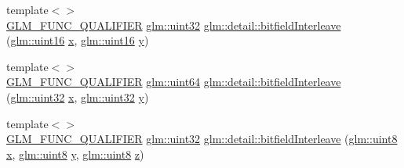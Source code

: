 \begin{DoxyCompactItemize}
\item 
{\footnotesize template$<$$>$ }\\\mbox{\hyperlink{setup_8hpp_a33fdea6f91c5f834105f7415e2a64407}{G\+L\+M\+\_\+\+F\+U\+N\+C\+\_\+\+Q\+U\+A\+L\+I\+F\+I\+ER}} \mbox{\hyperlink{group__gtc__type__precision_ga202b6a53c105fcb7e531f9b443518451}{glm\+::uint32}} \mbox{\hyperlink{namespaceglm_1_1detail_ac5f2b38221d4447775e88f1b003f8113}{glm\+::detail\+::bitfield\+Interleave}} (\mbox{\hyperlink{group__gtc__type__precision_gad8c2939e1fdd8e5828b31d95c52255d5}{glm\+::uint16}} \mbox{\hyperlink{glad_8h_a92d0386e5c19fb81ea88c9f99644ab1d}{x}}, \mbox{\hyperlink{group__gtc__type__precision_gad8c2939e1fdd8e5828b31d95c52255d5}{glm\+::uint16}} \mbox{\hyperlink{glad_8h_a66ddd433d2cacfe27f5906b7e86faeed}{y}})
\item 
{\footnotesize template$<$$>$ }\\\mbox{\hyperlink{setup_8hpp_a33fdea6f91c5f834105f7415e2a64407}{G\+L\+M\+\_\+\+F\+U\+N\+C\+\_\+\+Q\+U\+A\+L\+I\+F\+I\+ER}} \mbox{\hyperlink{group__gtc__type__precision_gae3632bf9b37da66233d78930dd06378a}{glm\+::uint64}} \mbox{\hyperlink{namespaceglm_1_1detail_a7f40bc91b3d293fae0f7df8de85cdcc6}{glm\+::detail\+::bitfield\+Interleave}} (\mbox{\hyperlink{group__gtc__type__precision_ga202b6a53c105fcb7e531f9b443518451}{glm\+::uint32}} \mbox{\hyperlink{glad_8h_a92d0386e5c19fb81ea88c9f99644ab1d}{x}}, \mbox{\hyperlink{group__gtc__type__precision_ga202b6a53c105fcb7e531f9b443518451}{glm\+::uint32}} \mbox{\hyperlink{glad_8h_a66ddd433d2cacfe27f5906b7e86faeed}{y}})
\item 
{\footnotesize template$<$$>$ }\\\mbox{\hyperlink{setup_8hpp_a33fdea6f91c5f834105f7415e2a64407}{G\+L\+M\+\_\+\+F\+U\+N\+C\+\_\+\+Q\+U\+A\+L\+I\+F\+I\+ER}} \mbox{\hyperlink{group__gtc__type__precision_ga202b6a53c105fcb7e531f9b443518451}{glm\+::uint32}} \mbox{\hyperlink{namespaceglm_1_1detail_a27e9c62ce3ad180236573daec6a6461f}{glm\+::detail\+::bitfield\+Interleave}} (\mbox{\hyperlink{group__gtc__type__precision_ga1a7dcd8aac97cc8020817c94049deff2}{glm\+::uint8}} \mbox{\hyperlink{glad_8h_a92d0386e5c19fb81ea88c9f99644ab1d}{x}}, \mbox{\hyperlink{group__gtc__type__precision_ga1a7dcd8aac97cc8020817c94049deff2}{glm\+::uint8}} \mbox{\hyperlink{glad_8h_a66ddd433d2cacfe27f5906b7e86faeed}{y}}, \mbox{\hyperlink{group__gtc__type__precision_ga1a7dcd8aac97cc8020817c94049deff2}{glm\+::uint8}} \mbox{\hyperlink{glad_8h_acb78bf1972d3eaf07da34ff2e0a2f133}{z}})
\item 

\end{DoxyCompactItemize}
